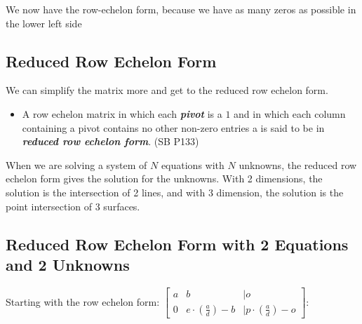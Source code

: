 \documentclass[
]{book}
\providecommand{\tightlist}{%
  \setlength{\itemsep}{0pt}\setlength{\parskip}{0pt}}
\begin{document}
We now have the row-echelon form, because we have as many zeros as
possible in the lower left side

\hypertarget{reduced-row-echelon-form}{%
\subsection{Reduced Row Echelon Form}\label{reduced-row-echelon-form}}

We can simplify the matrix more and get to the reduced row echelon form.

\begin{itemize}
\tightlist
\item
  A row echelon matrix in which each \textbf{\emph{pivot}} is a \(1\) and in which
  each column containing a pivot contains no other non-zero entries a
  is said to be in \textbf{\emph{reduced row echelon form}}. (SB P133)
\end{itemize}

When we are solving a system of \(N\) equations with \(N\) unknowns, the
reduced row echelon form gives the solution for the unknowns. With 2
dimensions, the solution is the intersection of 2 lines, and with 3
dimension, the solution is the point intersection of 3 surfaces.

\hypertarget{reduced-row-echelon-form-with-2-equations-and-2-unknowns}{%
\subsection{Reduced Row Echelon Form with 2 Equations and 2 Unknowns}\label{reduced-row-echelon-form-with-2-equations-and-2-unknowns}}

Starting with the row echelon form: \(\left\lbrack \begin{array}{ccl} a & b & |o\\ 0 & e\cdot (\frac{a}{d})-b & |p\cdot (\frac{a}{d})-o \end{array}\right\rbrack\):
\end{document}
